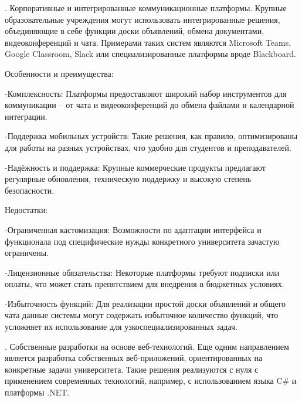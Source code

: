 {	\par {}. Корпоративные и интегрированные коммуникационные платформы. Крупные образовательные учреждения могут использовать интегрированные решения, объединяющие в себе функции доски объявлений, обмена документами, видеоконференций и чата. Примерами таких систем являются Microsoft Teams, Google Classroom, Slack или специализированные платформы вроде Blackboard.
	
	\par \redline Особенности и преимущества:
	
	\par \redline -Комплексность: Платформы предоставляют широкий набор инструментов для коммуникации – от чата и видеоконференций до обмена файлами и календарной интеграции.
	
	\par \redline -Поддержка мобильных устройств: Такие решения, как правило, оптимизированы для работы на разных устройствах, что удобно для студентов и преподавателей.
	
	\par \redline -Надёжность и поддержка: Крупные коммерческие продукты предлагают регулярные обновления, техническую поддержку и высокую степень безопасности.
	
	\par \redline Недостатки:
	
	\par \redline -Ограниченная кастомизация: Возможности по адаптации интерфейса и функционала под специфические нужды конкретного университета зачастую ограничены.
	
	\par \redline -Лицензионные обязательства: Некоторые платформы требуют подписки или оплаты, что может стать препятствием для внедрения в бюджетных условиях.
	
	\par \redline -Избыточность функций: Для реализации простой доски объявлений и общего чата данные системы могут содержать избыточное количество функций, что усложняет их использование для узкоспециализированных задач. 
	
	\par {}. Собственные разработки на основе веб-технологий. Еще одним направлением является разработка собственных веб-приложений, ориентированных на конкретные задачи университета. Такие решения реализуются с нуля с применением современных технологий, например, с использованием языка C\# и платформы .NET.
	
}
